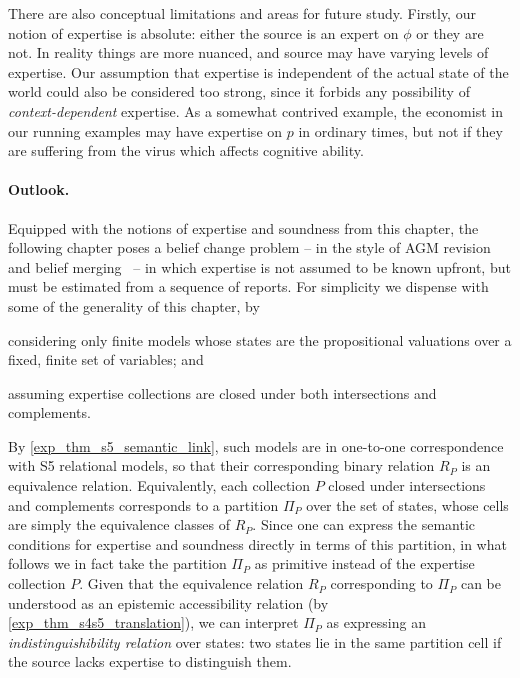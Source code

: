 There are also conceptual limitations and areas for future study. Firstly, our
notion of expertise is absolute: either the source is an expert on $\phi$ or
they are not. In reality things are more nuanced, and source may have varying
levels of expertise. Our assumption that expertise is independent of the actual
state of the world could also be considered too strong, since it forbids any
possibility of \emph{context-dependent} expertise. As a somewhat contrived
example, the economist in our running examples may have expertise on $p$ in
ordinary times, but not if they are suffering from the virus which affects
cognitive ability.

\paragraph{Outlook.}

Equipped with the notions of expertise and soundness from this chapter, the
following chapter poses a belief change problem -- in the style of AGM
revision~\cite{alchourron1985logic} and belief
merging~\cite{konieczny2002merging} -- in which expertise is not assumed to be
known upfront, but must be estimated from a sequence of reports. For simplicity
we dispense with some of the generality of this chapter, by
\begin{inlinelist}
    \item considering only finite models whose states are the propositional
          valuations over a fixed, finite set of variables; and
    \item assuming expertise collections are closed under both intersections
          and complements.
\end{inlinelist}
By \cref{exp_thm_s5_semantic_link}, such models are in one-to-one
correspondence with S5 relational models, so that their corresponding binary
relation $R_P$ is an equivalence relation. Equivalently, each collection $P$
closed under intersections and complements corresponds to a partition $\Pi_P$
over the set of states, whose cells are simply the equivalence classes of
$R_P$. Since one can express the semantic conditions for expertise and
soundness directly in terms of this partition, in what follows we in fact take
the partition $\Pi_P$ as primitive instead of the expertise collection $P$.
Given that the equivalence relation $R_P$ corresponding to $\Pi_P$ can be
understood as an epistemic accessibility relation (by
\cref{exp_thm_s4s5_translation}), we can interpret $\Pi_P$ as expressing an
\emph{indistinguishibility relation} over states: two states lie in the same
partition cell if the source lacks expertise to distinguish them.
